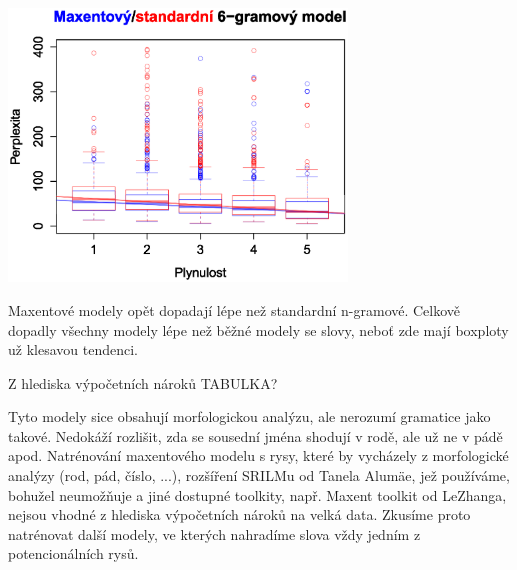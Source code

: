 \documentclass[12pt,a4paper]{report}
\begin{document}
\begin{center}	
	\includegraphics[width=90mm]{./grafy/morf/porovnani/all.svg.eps}	
\end{center}
Maxentové modely opět dopadají lépe než standardní n-gramové. Celkově dopadly všechny modely lépe než běžné modely se slovy, neboť zde mají boxploty už klesavou tendenci.

Z hlediska výpočetních nároků TABULKA?

Tyto modely sice obsahují morfologickou analýzu, ale nerozumí gramatice jako takové. Nedokáží rozlišit, zda se sousední jména shodují v rodě, ale už ne v pádě apod. Natrénování maxentového modelu s rysy, které by vycházely z morfologické analýzy (rod, pád, číslo, ...), rozšíření SRILMu od Tanela Alumäe, jež používáme, bohužel neumožňuje a jiné dostupné toolkity, např. Maxent toolkit od LeZhanga, nejsou vhodné z hlediska výpočetních nároků na velká data. Zkusíme proto natrénovat další modely, ve kterých nahradíme slova vždy jedním z potencionálních rysů. 
\end{document}
